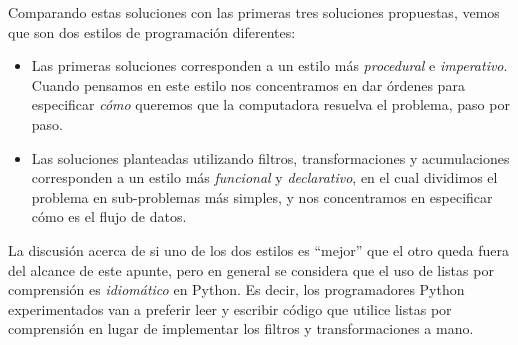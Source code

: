 \begin{subappendices}
Comparando estas soluciones con las primeras tres soluciones
propuestas, vemos que son dos estilos de programación diferentes:

\begin{itemize}
    \item Las primeras soluciones corresponden a un estilo más \emph{procedural} e
        \emph{imperativo}. Cuando pensamos en este estilo nos concentramos en
        dar órdenes para especificar \emph{cómo} queremos que la computadora
        resuelva el problema, paso por paso.
    \item Las soluciones planteadas utilizando filtros, transformaciones y
        acumulaciones corresponden a un estilo más \emph{funcional} y
        \emph{declarativo}, en el cual dividimos el problema en sub-problemas
        más simples, y nos concentramos en especificar cómo es el flujo de datos.
\end{itemize}

La discusión acerca de si uno de los dos estilos es ``mejor'' que el otro queda
fuera del alcance de este apunte, pero en general se considera que el uso de
listas por comprensión es \emph{idiomático} en Python. Es decir, los
programadores Python experimentados van a preferir leer y escribir código que
utilice listas por comprensión en lugar de implementar los filtros y
transformaciones a mano.
\end{subappendices}
